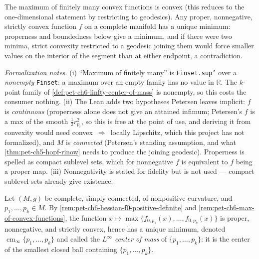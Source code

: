 \begin{remark}
  \label{rem:pet-ch6-max-of-convex-functions}


  The maximum of finitely many convex functions is convex (this reduces to
  the one-dimensional statement by restricting to geodesics). Any proper,
  nonnegative, strictly convex function $f$ on a complete manifold has a
  unique minimum: properness and boundedness below give a minimum, and if
  there were two minima, strict convexity restricted to a geodesic joining
  them would force smaller values on the interior of the segment than at
  either endpoint, a contradiction.

  \emph{Formalization notes.} (i) ``Maximum of finitely many'' is
  \texttt{Finset.sup'} over a \emph{nonempty} \texttt{Finset}: a maximum over
  an empty family has no value in $\mathbb{R}$. The $k$-point family of
  \cref{def:pet-ch6-linfty-center-of-mass} is nonempty, so this costs the
  consumer nothing. (ii) The Lean adds two hypotheses Petersen leaves
  implicit: $f$ is \emph{continuous} (properness alone does not give an
  attained infimum; Petersen's $f$ is a max of the smooth $\tfrac12r_{p_i}^2$,
  so this is free at the point of use, and deriving it from convexity would
  need convex~$\Rightarrow$~locally Lipschitz, which this project has not
  formalized), and $M$ is \emph{connected} (Petersen's standing assumption,
  and what \cref{thm:pet-ch5-hopf-rinow} needs to produce the joining
  geodesic). Properness is spelled as compact sublevel sets, which for
  nonnegative $f$ is equivalent to $f$ being a proper map. (iii)
  Nonnegativity is stated for fidelity but is not used --- compact sublevel
  sets already give existence.
\end{remark}

\begin{definition}
  \label{def:pet-ch6-linfty-center-of-mass}


  Let $(M,g)$ be complete, simply connected, of nonpositive curvature, and
  $p_1,\dots,p_k\in M$. By
  \cref{rem:pet-ch6-hessian-f0-positive-definite} and
  \cref{rem:pet-ch6-max-of-convex-functions}, the function
  $x\mapsto\max\{f_{0,p_1}(x),\dots,f_{0,p_k}(x)\}$ is proper,
  nonnegative, and strictly convex, hence has a unique minimum, denoted
  $\operatorname{cm}_\infty\{p_1,\dots,p_k\}$ and called the \emph{$L^\infty$ center of
  mass} of $\{p_1,\dots,p_k\}$: it is the center of the smallest closed ball
  containing $\{p_1,\dots,p_k\}$.
\end{definition}

